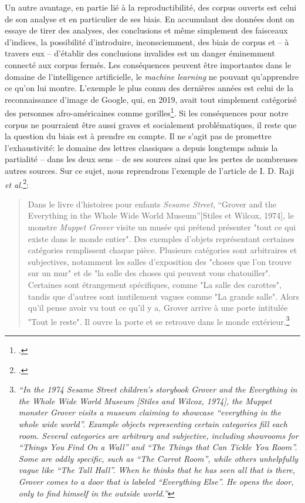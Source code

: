 Un autre avantage, en partie lié à la reproductibilité, des corpus ouverts est celui de son analyse et en particulier de ses biais. En accumulant des données dont on essaye de tirer des analyses, des conclusions et même simplement des faisceaux d'indices, la possibilité d'introduire, inconsciemment, des biais de corpus et -- à travers eux -- d'établir des conclusions invalides est un danger éminemment connecté aux corpus fermés. Les conséquences peuvent être importantes dans le domaine de l'intelligence artificielle, le \textit{machine learning} ne pouvant qu'apprendre ce qu'on lui montre. L'exemple le plus connu des dernières années est celui de la reconnaissance d'image de Google, qui, en 2019, avait tout simplement catégorisé des personnes afro-américaines comme gorilles\footcite{lohr2018facial, chokshi2019facial}. Si les conséquences pour notre corpus ne pourraient être aussi graves et socialement problématiques, il reste que la question du biais est à prendre en compte. Il ne s'agit pas de promettre l'exhaustivité: le domaine des lettres classiques a depuis longtemps admis la partialité -- dans les deux sens -- de ses sources ainsi que les pertes de nombreuses autres sources. Sur ce sujet, nous reprendrons l'exemple de l'article de I. D. Raji \textit{et al.}\footcite{raji2021ai}:

\begin{quote}{\cite{raji2021ai}}
    Dans le livre d'histoires pour enfants \textit{Sesame Street}, ``Grover and the Everything in the Whole Wide World Museum''[Stiles et Wilcox, 1974], le monstre \textit{Muppet Grover} visite un musée qui prétend présenter "tout ce qui existe dans le monde entier". Des exemples d'objets représentant certaines catégories remplissent chaque pièce. Plusieurs catégories sont arbitraires et subjectives, notamment les salles d'exposition des "choses que l'on trouve sur un mur" et de "la salle des choses qui peuvent vous chatouiller". Certaines sont étrangement spécifiques, comme "La salle des carottes", tandis que d'autres sont inutilement vagues comme "La grande salle". Alors qu'il pense avoir vu tout ce qu'il y a, Grover arrive à une porte intitulée "Tout le reste". Il ouvre la porte et se retrouve dans le monde extérieur.\footnote{\textit{``In the 1974 Sesame Street children’s storybook Grover and the Everything in the Whole Wide World Museum [Stiles and Wilcox, 1974], the Muppet monster Grover visits a museum claiming to showcase “everything in the whole wide world”. Example objects representing certain categories fill each room. Several categories are arbitrary and subjective, including showrooms for “Things You Find On a Wall” and “The Things that Can Tickle You Room”. Some are oddly specific, such as “The Carrot Room”, while others unhelpfully vague like “The Tall Hall”. When he thinks that he has seen all that is there, Grover comes to a door that is labeled “Everything Else”. He opens the door, only to find himself in the outside world.''}}
\end{quote}

